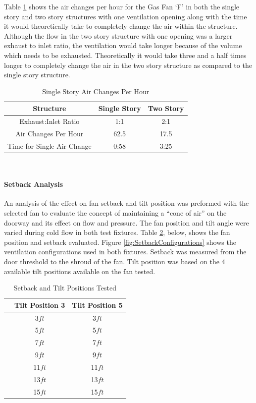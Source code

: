\documentclass{article}
\begin{document}
Table \ref{table:airchanges} shows the air changes per hour for the Gas Fan `F' in both the single story and two story structures with one ventilation opening along with the time it would theoretically take to completely change the air within the structure. Although the flow in the two story structure with one opening was a larger exhaust to inlet ratio, the ventilation would take longer because of the volume which needs to be exhausted. Theoretically it would take three and a half times longer to completely change the air in the two story structure as compared to the single story structure. 

\begin{table}[H]
	\centering
	\caption{Single Story Air Changes Per Hour}
	\begin{tabular}{|c|c|c|}
		\hline
		Structure & Single Story & Two  Story \\ \hline \hline
		Exhaust:Inlet Ratio & 1:1 & 2:1 \\ \hline \hline
		Air Changes Per Hour & 62.5 & 17.5 \\ \hline
		Time for Single Air Change & 0:58 & 3:25  \\ \hline
	\end{tabular}
	\label{table:airchanges}
\end{table}\

\paragraph{Setback Analysis} \mbox{}

An analysis of the effect on fan setback and tilt position was preformed with the selected fan to evaluate the concept of maintaining a ``cone of air'' on the doorway and its effect on flow and pressure. The fan position and tilt angle were varied during cold flow in both test fixtures. Table \ref{table:SetbackPositions}, below, shows the fan position and setback evaluated. Figure \ref{fig:SetbackConfigurations} shows the ventilation configurations used in both fixtures. Setback was measured from the door threshold to the shroud of the fan. Tilt position was based on the 4 available tilt positions available on the fan tested. 

\begin{table}[H]
	\caption{Setback and Tilt Positions Tested}
	\centering
	\begin{tabular}{|c|c|c|}
		\hline
		& \textbf{Tilt Position 3} & \textbf{Tilt Position 5} \\ \hline \hline
		\parbox[t]{2mm}{} & 3$ft$ & 3$ft$ \\ 
		& 5$ft$ & 5$ft$ \\ 
		& 7$ft$ & 7$ft$ \\ 
		& 9$ft$ & 9$ft$ \\ 
		& 11$ft$ & 11$ft$ \\ 
		& 13$ft$ & 13$ft$ \\ 
		& 15$ft$ & 15$ft$ \\ \hline	
	\end{tabular}
	\label{table:SetbackPositions}
\end{table}
\end{document}
